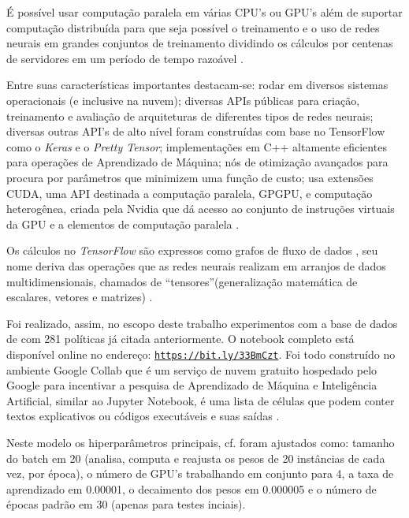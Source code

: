 É possível usar computação paralela em várias CPU's ou GPU's além de suportar computação distribuída para que seja possível o treinamento e o uso de redes neurais em grandes conjuntos de treinamento dividindo os cálculos por centenas de servidores em um período de tempo razoável \cite{geron_maos_2020}. 

Entre suas características importantes destacam-se: rodar em diversos sistemas operacionais (e inclusive na nuvem); diversas APIs públicas para criação, treinamento e avaliação de arquiteturas de diferentes tipos de redes neurais; diversas outras API's de alto nível foram construídas com base no TensorFlow como o \textit{Keras} e o \textit{Pretty Tensor}; implementações em C++ altamente eficientes para operações de Aprendizado de Máquina; nós de otimização avançados para procura por parâmetros que minimizem uma função de custo; usa extensões CUDA, uma  API destinada a computação paralela, GPGPU, e computação heterogênea, criada pela Nvidia que dá acesso ao conjunto de instruções virtuais da GPU e a elementos de computação paralela \cite{geron_maos_2020}.

Os cálculos no \textit{TensorFlow} são expressos como grafos de fluxo de dados , seu nome deriva das operações que as redes neurais realizam em arranjos de dados multidimensionais, chamados de ``tensores''(generalização matemática de escalares, vetores e matrizes) \cite{kadimisetty_tensorflow_2018}.

Foi realizado, assim, no escopo deste trabalho experimentos com a base de dados de com 281 políticas já citada anteriormente. O notebook completo está disponível online no endereço: \underline{\texttt{https://bit.ly/33BmCzt}}. Foi todo construído no ambiente Google Collab que é um serviço de nuvem gratuito hospedado pelo Google para incentivar a pesquisa de Aprendizado de Máquina e Inteligência Artificial, similar ao Jupyter Notebook, é uma lista de células que podem conter textos explicativos ou códigos executáveis e suas saídas \cite{collab_2020}.

Neste modelo os hiperparâmetros principais, cf.  foram ajustados como: tamanho do batch em 20 (analisa, computa e reajusta os pesos de 20 instâncias de cada vez, por época), o número de GPU's trabalhando em conjunto para 4, a taxa de aprendizado em 0.00001, o decaimento dos pesos em 0.000005 e o número de épocas padrão em 30 (apenas para testes inciais).

